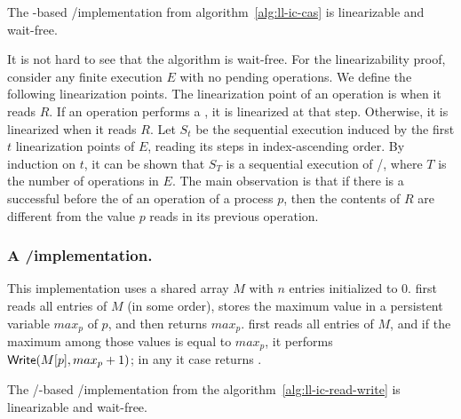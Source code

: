 \begin{theorem}
\label{theorem:cas-ll-ic}
The \CAS-based \LL/\IC implementation from algorithm~\ref{alg:ll-ic-cas} is linearizable and wait-free.
\end{theorem}

\begin{proofT}
  It is not hard to see that the algorithm is wait-free. For the linearizability proof, consider any finite execution $E$ with no pending operations. We define the following linearization points. The linearization point of an \LL operation is when it reads $R$. If an \IC operation performs a \CAS, it is linearized at that step. Otherwise, it is linearized when it reads $R$. Let $S_t$ be the sequential execution induced by the first $t$ linearization points of $E$, reading its steps in index-ascending order. By induction on $t$, it can be shown that $S_T$ is a sequential execution of \LL/\IC, where $T$ is the number of operations in $E$. The main observation is that if there is a successful \CAS before the \CAS of an \IC operation of a process $p$, then the contents of $R$ are different from the value $p$ reads in its previous \LL operation.
\end{proofT}

\subsubsection{A \R/\W implementation.}
This implementation uses a shared array $M$ with $n$ entries initialized to 0.  \LL first reads all entries of $M$ (in some order), stores the maximum value in a persistent variable $max_p$ of $p$, and then returns $max_p$.  \IC first reads all entries of $M$, and if the maximum among those values is equal to $max_p$, it performs ${\sf Write}(M[p], max_p + 1)$; in any it case returns \ok.



\begin{theorem}
\label{theorem:rw-ll-ic}
  The \R/\W-based \LL/\IC implementation from the algorithm~\ref{alg:ll-ic-read-write} is linearizable and wait-free.
\end{theorem}

